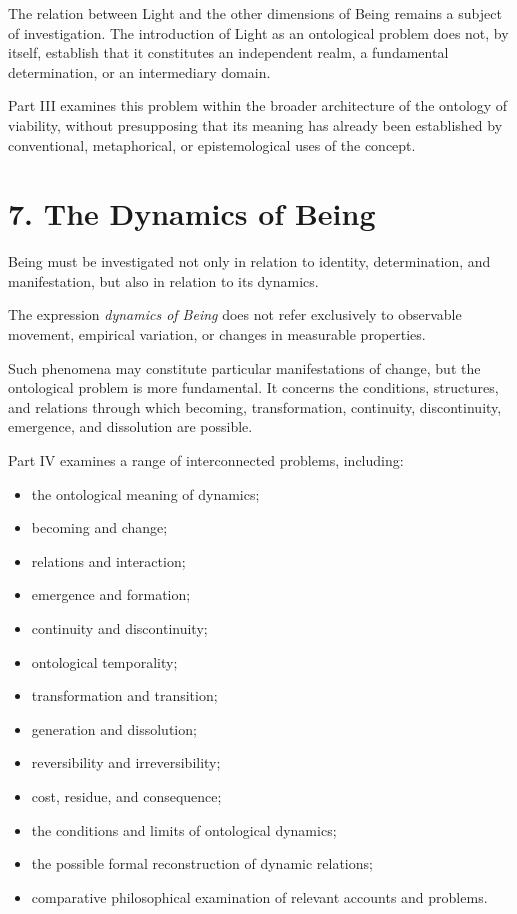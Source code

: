 The relation between Light and the other dimensions
of Being remains a subject of investigation. The
introduction of Light as an ontological problem
does not, by itself, establish that it constitutes
an independent realm, a fundamental determination,
or an intermediary domain.

Part III examines this problem within the broader
architecture of the ontology of viability, without
presupposing that its meaning has already been
established by conventional, metaphorical, or
epistemological uses of the concept.


\section*{7. The Dynamics of Being}

Being must be investigated not only in relation
to identity, determination, and manifestation,
but also in relation to its dynamics.

The expression \textit{dynamics of Being} does
not refer exclusively to observable movement,
empirical variation, or changes in measurable
properties.

Such phenomena may constitute particular
manifestations of change, but the ontological
problem is more fundamental. It concerns the
conditions, structures, and relations through which
becoming, transformation, continuity, discontinuity,
emergence, and dissolution are possible.

Part IV examines a range of interconnected problems,
including:

\begin{itemize}
    \item the ontological meaning of dynamics;
    \item becoming and change;
    \item relations and interaction;
    \item emergence and formation;
    \item continuity and discontinuity;
    \item ontological temporality;
    \item transformation and transition;
    \item generation and dissolution;
    \item reversibility and irreversibility;
    \item cost, residue, and consequence;
    \item the conditions and limits of ontological
    dynamics;
    \item the possible formal reconstruction of
    dynamic relations;
    \item comparative philosophical examination
    of relevant accounts and problems.
\end{itemize}

